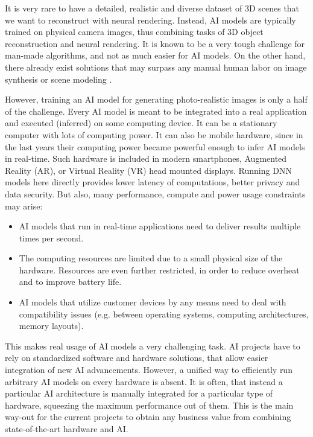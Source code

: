 It is very rare to have a detailed, realistic and diverse dataset of 3D scenes that we want to reconstruct with neural rendering. Instead, AI models are typically trained on physical camera images, thus combining tasks of 3D object reconstruction and neural rendering. It is known to be a very tough challenge for man-made algorithms, and not as much easier for AI models. On the other hand, there already exist solutions that may surpass any manual human labor on image synthesis or scene modeling \cite{dnn:stylegan-v1-19,dnn:stylegan-v2-20,dnn:stylegan-v3-21,dnn:nerf20}.
 
However, training an AI model for generating photo-realistic images is only a half of the challenge. Every AI model is meant to be integrated into a real application and executed (inferred) on some computing device. It can be a stationary computer with lots of computing power. It can also be mobile hardware, since in the last years their computing power became powerful enough to infer AI models in real-time. Such hardware is included in modern smartphones, Augmented Reality (AR), or Virtual Reality (VR) head mounted displays. Running DNN models here directly provides lower latency of computations, better privacy and data security. But also, many performance, compute and power usage constraints may arise:
\begin{itemize}
	\item  AI models that run in real-time applications need to deliver results multiple times per second.
	\item  The computing resources are limited due to a small physical size of the hardware. Resources are even further restricted, in order to reduce overheat and to improve battery life.
	\item  AI models that utilize customer devices by any means need to deal with compatibility issues (e.g. between operating systems, computing architectures, memory layouts).
\end{itemize}

This makes real usage of AI models a very challenging task. AI projects have to rely on standardized software and hardware solutions, that allow easier integration of new AI advancements. However, a unified way to efficiently run arbitrary AI models on every hardware is absent. It is often, that instead a particular AI architecture is manually integrated for a particular type of hardware, squeezing the maximum performance out of them. This is the main way-out for the current projects to obtain any business value from combining state-of-the-art hardware and AI.
 
